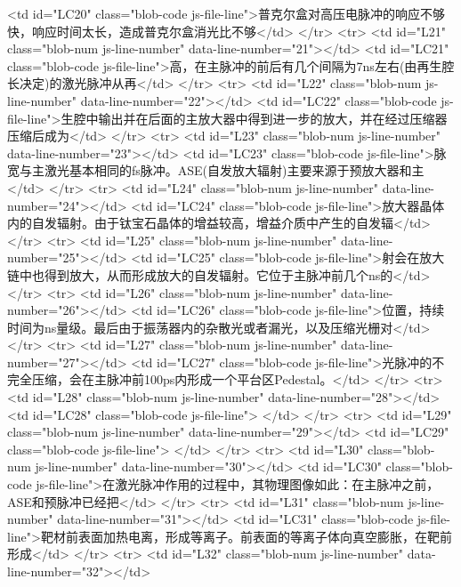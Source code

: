         <td id="LC20" class="blob-code js-file-line">普克尔盒对高压电脉冲的响应不够快，响应时间太长，造成普克尔盒消光比不够</td>
      </tr>
      <tr>
        <td id="L21" class="blob-num js-line-number" data-line-number="21"></td>
        <td id="LC21" class="blob-code js-file-line">高，在主脉冲的前后有几个间隔为7ns左右(由再生腔长决定)的激光脉冲从再</td>
      </tr>
      <tr>
        <td id="L22" class="blob-num js-line-number" data-line-number="22"></td>
        <td id="LC22" class="blob-code js-file-line">生腔中输出并在后面的主放大器中得到进一步的放大，并在经过压缩器压缩后成为</td>
      </tr>
      <tr>
        <td id="L23" class="blob-num js-line-number" data-line-number="23"></td>
        <td id="LC23" class="blob-code js-file-line">脉宽与主激光基本相同的fs脉冲。ASE(自发放大辐射)主要来源于预放大器和主</td>
      </tr>
      <tr>
        <td id="L24" class="blob-num js-line-number" data-line-number="24"></td>
        <td id="LC24" class="blob-code js-file-line">放大器晶体内的自发辐射。由于钛宝石晶体的增益较高，增益介质中产生的自发辐</td>
      </tr>
      <tr>
        <td id="L25" class="blob-num js-line-number" data-line-number="25"></td>
        <td id="LC25" class="blob-code js-file-line">射会在放大链中也得到放大，从而形成放大的自发辐射。它位于主脉冲前几个ns的</td>
      </tr>
      <tr>
        <td id="L26" class="blob-num js-line-number" data-line-number="26"></td>
        <td id="LC26" class="blob-code js-file-line">位置，持续时间为ns量级。最后由于振荡器内的杂散光或者漏光，以及压缩光栅对</td>
      </tr>
      <tr>
        <td id="L27" class="blob-num js-line-number" data-line-number="27"></td>
        <td id="LC27" class="blob-code js-file-line">光脉冲的不完全压缩，会在主脉冲前100ps内形成一个平台区Pedestal。</td>
      </tr>
      <tr>
        <td id="L28" class="blob-num js-line-number" data-line-number="28"></td>
        <td id="LC28" class="blob-code js-file-line">
</td>
      </tr>
      <tr>
        <td id="L29" class="blob-num js-line-number" data-line-number="29"></td>
        <td id="LC29" class="blob-code js-file-line">
</td>
      </tr>
      <tr>
        <td id="L30" class="blob-num js-line-number" data-line-number="30"></td>
        <td id="LC30" class="blob-code js-file-line">在激光脉冲作用的过程中，其物理图像如此：在主脉冲之前，ASE和预脉冲已经把</td>
      </tr>
      <tr>
        <td id="L31" class="blob-num js-line-number" data-line-number="31"></td>
        <td id="LC31" class="blob-code js-file-line">靶材前表面加热电离，形成等离子。前表面的等离子体向真空膨胀，在靶前形成</td>
      </tr>
      <tr>
        <td id="L32" class="blob-num js-line-number" data-line-number="32"></td>
